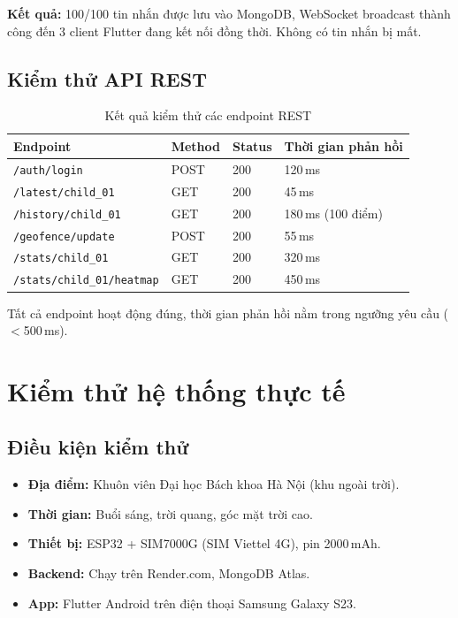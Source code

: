 \textbf{Kết quả:} 100/100 tin nhắn được lưu vào MongoDB, WebSocket broadcast thành công đến 3 client Flutter đang kết nối đồng thời. Không có tin nhắn bị mất.

\subsection{Kiểm thử API REST}

\begin{table}[H]
\centering
\caption{Kết quả kiểm thử các endpoint REST}
\label{tab:api_test}
\begin{tabularx}{\textwidth}{l l l X}
\toprule
\textbf{Endpoint} & \textbf{Method} & \textbf{Status} & \textbf{Thời gian phản hồi} \\
\midrule
\texttt{/auth/login}          & POST   & 200 & 120\,ms \\
\texttt{/latest/child\_01}    & GET    & 200 & 45\,ms \\
\texttt{/history/child\_01}   & GET    & 200 & 180\,ms (100 điểm) \\
\texttt{/geofence/update}     & POST   & 200 & 55\,ms \\
\texttt{/stats/child\_01}     & GET    & 200 & 320\,ms \\
\texttt{/stats/child\_01/heatmap} & GET & 200 & 450\,ms \\
\bottomrule
\end{tabularx}
\end{table}

Tất cả endpoint hoạt động đúng, thời gian phản hồi nằm trong ngưỡng yêu cầu ($<$500\,ms).

\section{Kiểm thử hệ thống thực tế}

\subsection{Điều kiện kiểm thử}

\begin{itemize}[noitemsep]
  \item \textbf{Địa điểm:} Khuôn viên Đại học Bách khoa Hà Nội (khu ngoài trời).
  \item \textbf{Thời gian:} Buổi sáng, trời quang, góc mặt trời cao.
  \item \textbf{Thiết bị:} ESP32 + SIM7000G (SIM Viettel 4G), pin 2000\,mAh.
  \item \textbf{Backend:} Chạy trên Render.com, MongoDB Atlas.
  \item \textbf{App:} Flutter Android trên điện thoại Samsung Galaxy S23.
\end{itemize}

